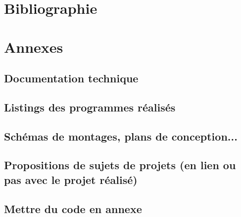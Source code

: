 \documentclass[a4paper, 12pt]{report} %
\begin{document}
\chapter*{Bibliographie}
\makeatletter
\renewcommand{\enoteheading}{\par\vspace{1 em}}
\renewcommand{\theenmark}{\makebox[0.5 em][r]{\@theenmark}}
\renewcommand{\enoteformat}{\parindent = 2 em
  							\leftskip = 0.5 em
  							[\theenmark]\enspace\ignorespaces}							
\makeatother
\theendnotes


\newpage
\chapter*{Annexes}
\renewcommand{\thesection}{\Alph{section}}  %
\setcounter{section}{0} %

\section{Documentation technique}
\newpage

\section{Listings des programmes réalisés}
\newpage

\section{Schémas de montages, plans de conception...}
\newpage

\section{Propositions de sujets de projets (en lien ou pas avec le projet réalisé)}
\newpage

\section{Mettre du code en annexe}
\end{document}
